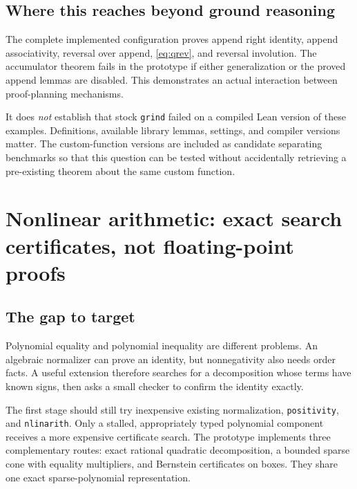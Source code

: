 \documentclass[11pt,letterpaper]{article}
\newcommand{\code}[1]{\texttt{#1}}
\theoremstyle{definition}\newtheorem{definition}[theorem]{Definition}
\theoremstyle{remark}\newtheorem{remark}[theorem]{Remark}
\begin{document}
\subsection{Where this reaches beyond ground reasoning}
The complete implemented configuration proves append right identity, append associativity, reversal over append, \eqref{eq:qrev}, and reversal involution. The accumulator theorem fails in the prototype if either generalization or the proved append lemmas are disabled. This demonstrates an actual interaction between proof-planning mechanisms.

It does \emph{not} establish that stock \code{grind} failed on a compiled Lean version of these examples. Definitions, available library lemmas, settings, and compiler versions matter. The custom-function versions are included as candidate separating benchmarks so that this question can be tested without accidentally retrieving a pre-existing theorem about the same custom function.

\section{Nonlinear arithmetic: exact search certificates, not floating-point proofs}
\subsection{The gap to target}
Polynomial equality and polynomial inequality are different problems. An algebraic normalizer can prove an identity, but nonnegativity also needs order facts. A useful extension therefore searches for a decomposition whose terms have known signs, then asks a small checker to confirm the identity exactly.

The first stage should still try inexpensive existing normalization, \code{positivity}, and \code{nlinarith}. Only a stalled, appropriately typed polynomial component receives a more expensive certificate search. The prototype implements three complementary routes: exact rational quadratic decomposition, a bounded sparse cone with equality multipliers, and Bernstein certificates on boxes. They share one exact sparse-polynomial representation.
\end{document}
